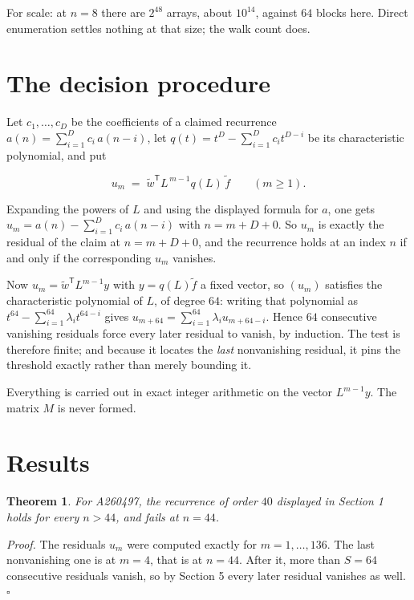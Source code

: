 \documentclass[11pt]{article}
\newtheorem{theorem}{Theorem}
\theoremstyle{definition}
\begin{document}
For scale: at $n = 8$ there are $2^{48}$ arrays, about $10^{14}$, against $64$ blocks here. Direct enumeration settles nothing at that size; the walk count does.

\section{The decision procedure}

Let $c_1,\dots,c_D$ be the coefficients of a claimed recurrence $a(n) = \sum_{i=1}^{D} c_i\,a(n-i)$, let $q(t) = t^{D} - \sum_{i=1}^{D} c_i t^{D-i}$ be its characteristic polynomial, and put

\[u_m \;=\; \tilde w^{\mathsf T} L^{\,m-1} q(L)\,\tilde f \qquad (m \ge 1).\]

Expanding the powers of $L$ and using the displayed formula for $a$, one gets $u_m = a(n) - \sum_{i=1}^{D} c_i\,a(n-i)$ with $n = m + D + 0$. So $u_m$ is exactly the residual of the claim at $n = m + D + 0$, and the recurrence holds at an index $n$ if and only if the corresponding $u_m$ vanishes.

Now $u_m = \tilde w^{\mathsf T} L^{m-1} y$ with $y = q(L)\tilde f$ a fixed vector, so $(u_m)$ satisfies the characteristic polynomial of $L$, of degree $64$: writing that polynomial as $t^{64} - \sum_{i=1}^{64} \lambda_i t^{64-i}$ gives $u_{m+64} = \sum_{i=1}^{64} \lambda_i u_{m+64-i}$. Hence $64$ consecutive vanishing residuals force every later residual to vanish, by induction. The test is therefore finite; and because it locates the {\itshape last} nonvanishing residual, it pins the threshold exactly rather than merely bounding it.

Everything is carried out in exact integer arithmetic on the vector $L^{m-1}y$. The matrix $M$ is never formed.

\section{Results}

\begin{theorem} For A260497, the recurrence of order $40$ displayed in Section 1 holds for every $n > 44$, and fails at $n = 44$.\end{theorem}

{\itshape Proof.} The residuals $u_m$ were computed exactly for $m = 1,\dots,136$. The last nonvanishing one is at $m = 4$, that is at $n = 44$. After it, more than $S = 64$ consecutive residuals vanish, so by Section 5 every later residual vanishes as well. $\square$
\end{document}
